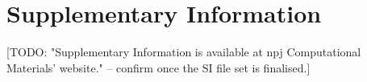 \documentclass[11pt]{article}
\begin{document}
\section*{Supplementary Information}
[TODO: "Supplementary Information is available at npj Computational Materials'
website." -- confirm once the SI file set is finalised.]

\end{document}
